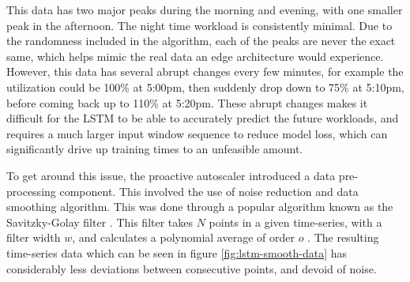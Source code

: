 This data has two major peaks during the morning and evening, with one smaller peak in the afternoon. The night time workload is consistently minimal. Due to the randomness included in the algorithm, each of the peaks are never the exact same, which helps mimic the real data an edge architecture would experience. However, this data has several abrupt changes every few minutes, for example the utilization could be 100\% at 5:00pm, then suddenly drop down to 75\% at 5:10pm, before coming back up to 110\% at 5:20pm. These abrupt changes makes it difficult for the LSTM to be able to accurately predict the future workloads, and requires a much larger input window sequence to reduce model loss, which can significantly drive up training times to an unfeasible amount.\par

To get around this issue, the proactive autoscaler introduced a data pre-processing component. This involved the use of noise reduction and data smoothing algorithm. This was done through a popular algorithm known as the Savitzky-Golay filter \cite{savitzky1964smoothing}. This filter takes $N$ points in a given time-series, with a filter width $w$, and calculates a polynomial average of order $o$ \cite{schafer2011savitzky}. The resulting time-series data which can be seen in figure \ref{fig:lstm-smooth-data} has considerably less deviations between consecutive points, and devoid of noise.\par

\begin{center}
\begin{minipage}{\linewidth}
    \label{fig:lstm-smooth-data}
\end{minipage}
\end{center}

